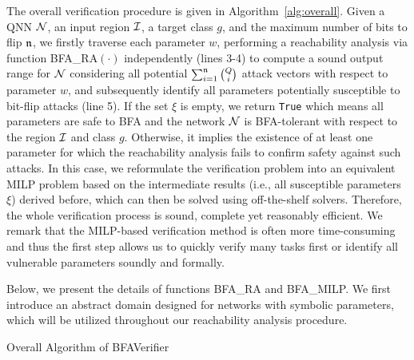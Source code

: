 The overall verification procedure is given in Algorithm~\ref{alg:overall}. 
Given a QNN ${\mathcal{N}}$, an input region ${\mathcal{I}}$, a target class $g$, and the maximum number of bits to flip $\mathfrak{n}$, we firstly traverse each parameter $w$, 
performing a reachability analysis via function {\sf BFA\_RA}$(\cdot)$ independently (lines 3-4) to compute a sound output range for ${\mathcal{N}}$ considering all potential $\sum_{i=1}^{\mathfrak{n}}\binom{Q}{i}$ attack vectors with respect to parameter $w$, and subsequently identify all parameters potentially susceptible to bit-flip attacks (line 5). 
If the set $\xi$ is empty, we return \texttt{True} which means all parameters are safe to BFA and the network ${\mathcal{N}}$ is BFA-tolerant with respect to the region ${\mathcal{I}}$ and class $g$. Otherwise, it implies the existence of at least one parameter for which the reachability analysis fails to confirm safety against such attacks. 
In this case, we reformulate the verification problem into an equivalent MILP problem based on the intermediate results (i.e., all susceptible parameters $\xi$) derived before, which can then be solved using off-the-shelf solvers. Therefore, the whole verification process \tool is sound, complete yet reasonably efficient. We remark that the MILP-based verification method is often more time-consuming and thus the first step allows us to quickly verify many tasks first or identify all vulnerable parameters soundly and formally.

Below, we present the details of functions {\sf BFA\_RA} and {\sf BFA\_MILP}. We first introduce an abstract domain designed for networks with symbolic parameters, which will be utilized throughout our reachability analysis procedure.

\begin{algorithm}[t]


    \caption{Overall Algorithm of {\sf BFAVerifier}}\label{alg:overall}

\end{algorithm}

